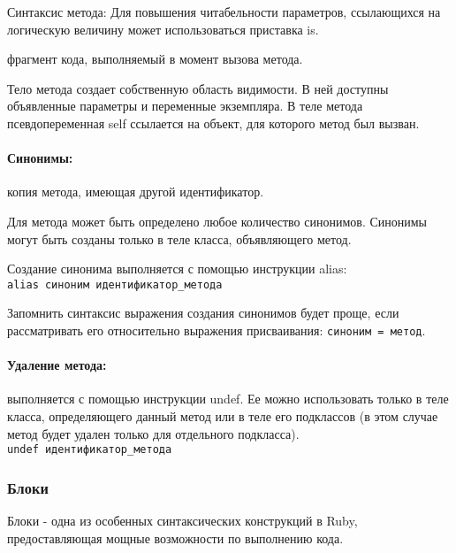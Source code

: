 \begin{keylist}{Синтаксис метода:}
  Для повышения читабельности параметров, ссылающихся на логическую величину может использоваться приставка is.

   фрагмент кода, выполняемый в момент вызова метода.

  Тело метода создает собственную область видимости. В ней доступны объявленные параметры и переменные экземпляра. В теле метода псевдопеременная self ссылается на объект, для которого метод был вызван.
  
\end{keylist}

\paragraph*{Синонимы:} копия метода, имеющая другой идентификатор.

Для метода может быть определено любое количество синонимов. Синонимы могут быть созданы только в теле класса, объявляющего метод.

Создание синонима выполняется с помощью инструкции alias:
\\\verb!alias синоним идентификатор_метода!

\begin{note}
Запомнить синтаксис выражения создания синонимов будет проще, если рассматривать его относительно выражения присваивания: \verb!синоним = метод!.
\end{note}

\paragraph*{Удаление метода:} выполняется с помощью инструкции undef. Ее можно использовать только в теле класса, определяющего данный метод или в теле его подклассов (в этом случае метод будет удален только для отдельного подкласса).
\\ \verb!undef идентификатор_метода!

\subsubsection*{Блоки}

Блоки - одна из особенных синтаксических конструкций в Ruby, предоставляющая мощные возможности по выполнению кода.

